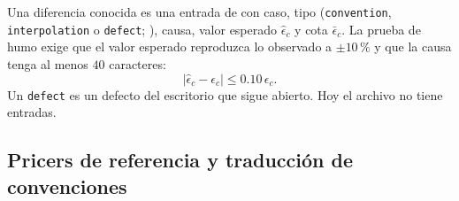 Una diferencia conocida es una entrada de  con caso,
tipo (\texttt{convention}, \texttt{interpolation} o \texttt{defect}; ),
causa, valor esperado $\hat\epsilon_c$ y cota $\bar\epsilon_c$. La prueba de humo exige que el valor esperado
reproduzca lo observado a $\pm 10\,\%$ y que la causa tenga al menos $40$ caracteres:
\begin{equation}\label{eq:cap12-esperada}
  \bigl|\hat\epsilon_c - \epsilon_c\bigr| \le 0.10\,\epsilon_c.
\end{equation}
Un \texttt{defect} es un defecto del escritorio que sigue abierto. Hoy el archivo no tiene entradas.

\subsection{Pricers de referencia y traducción de convenciones}\label{sec:cap12-pricers}

